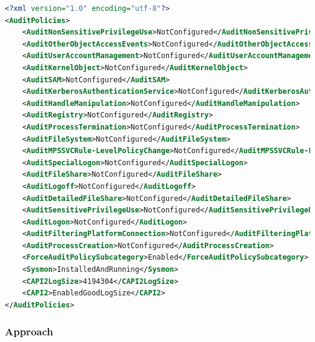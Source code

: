 \begin{lstlisting}[caption=Example Result Audit Policy Analysis, language=xml]
<?xml version="1.0" encoding="utf-8"?>
<AuditPolicies>
    <AuditNonSensitivePrivilegeUse>NotConfigured</AuditNonSensitivePrivilegeUse>
    <AuditOtherObjectAccessEvents>NotConfigured</AuditOtherObjectAccessEvents>
    <AuditUserAccountManagement>NotConfigured</AuditUserAccountManagement>
    <AuditKernelObject>NotConfigured</AuditKernelObject>
    <AuditSAM>NotConfigured</AuditSAM>
    <AuditKerberosAuthenticationService>NotConfigured</AuditKerberosAuthenticationService>
    <AuditHandleManipulation>NotConfigured</AuditHandleManipulation>
    <AuditRegistry>NotConfigured</AuditRegistry>
    <AuditProcessTermination>NotConfigured</AuditProcessTermination>
    <AuditFileSystem>NotConfigured</AuditFileSystem>
    <AuditMPSSVCRule-LevelPolicyChange>NotConfigured</AuditMPSSVCRule-LevelPolicyChange>
    <AuditSpecialLogon>NotConfigured</AuditSpecialLogon>
    <AuditFileShare>NotConfigured</AuditFileShare>
    <AuditLogoff>NotConfigured</AuditLogoff>
    <AuditDetailedFileShare>NotConfigured</AuditDetailedFileShare>
    <AuditSensitivePrivilegeUse>NotConfigured</AuditSensitivePrivilegeUse>
    <AuditLogon>NotConfigured</AuditLogon>
    <AuditFilteringPlatformConnection>NotConfigured</AuditFilteringPlatformConnection>
    <AuditProcessCreation>NotConfigured</AuditProcessCreation>
    <ForceAuditPolicySubcategory>Enabled</ForceAuditPolicySubcategory>
    <Sysmon>InstalledAndRunning</Sysmon>
    <CAPI2LogSize>4194304</CAPI2LogSize>
    <CAPI2>EnabledGoodLogSize</CAPI2>
</AuditPolicies>
\end{lstlisting}

\subsubsection{Approach}
